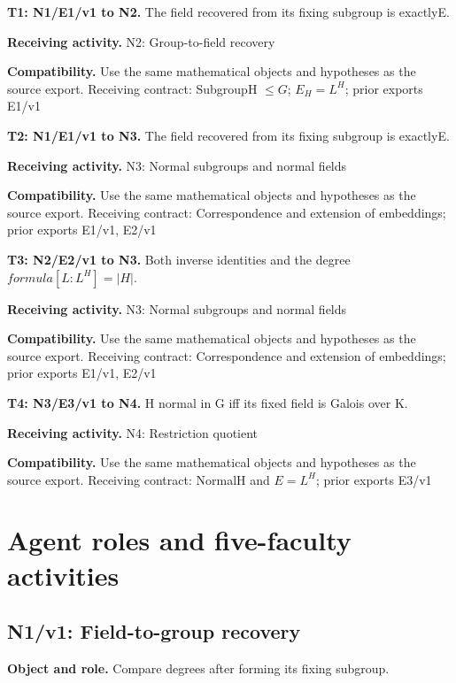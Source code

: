 \documentclass[preprint,12pt,aps,pra,showkeys,amsmath,amssymb,superscriptaddress,floatfix]{revtex4-2}
\theoremstyle{definition}
\theoremstyle{remark}
\newcommand{\field}[2]{\par\smallskip\noindent\textbf{#1.} #2\par}
\begin{document}
\begingroup\small\linespread{1.05}\selectfont

\field{T1: N1/E1/v1 to N2}{The field recovered from its fixing subgroup is exactlyE.}

\field{Receiving activity}{N2: Group-to-field recovery}

\field{Compatibility}{Use the same mathematical objects and hypotheses as the source export.
Receiving contract: SubgroupH \(\le G\); \(E_H=L^H\); prior exports
E1/v1}

\field{T2: N1/E1/v1 to N3}{The field recovered from its fixing subgroup is exactlyE.}

\field{Receiving activity}{N3: Normal subgroups and normal fields}

\field{Compatibility}{Use the same mathematical objects and hypotheses as the source export.
Receiving contract: Correspondence and extension of embeddings; prior
exports E1/v1, E2/v1}

\field{T3: N2/E2/v1 to N3}{Both inverse identities and the degree \(formula[L:L^H]=|H|\).}

\field{Receiving activity}{N3: Normal subgroups and normal fields}

\field{Compatibility}{Use the same mathematical objects and hypotheses as the source export.
Receiving contract: Correspondence and extension of embeddings; prior
exports E1/v1, E2/v1}

\field{T4: N3/E3/v1 to N4}{H normal in G iff its fixed field is Galois over K.}

\field{Receiving activity}{N4: Restriction quotient}

\field{Compatibility}{Use the same mathematical objects and hypotheses as the source export.
Receiving contract: NormalH and \(E=L^H\); prior exports E3/v1}

\endgroup

\clearpage\section{Agent roles and five-faculty activities}\begingroup\small\linespread{1.05}\selectfont{}

\subsection{N1/v1: Field-to-group recovery}

\field{Object and role}{Compare degrees after forming its fixing subgroup.}
\end{document}
